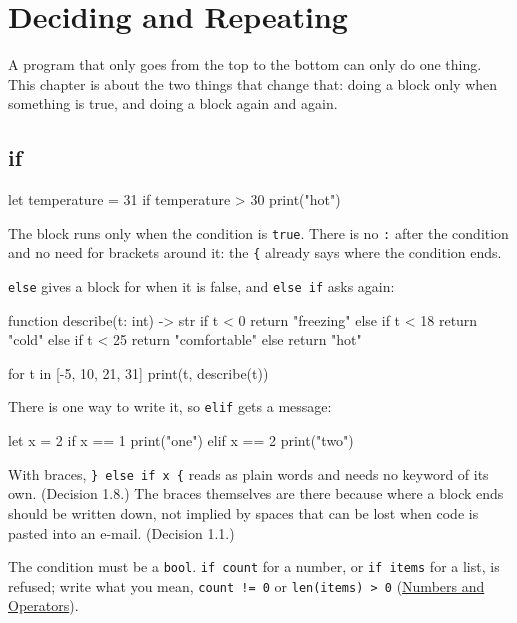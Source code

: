 \chapter{Deciding and Repeating}\label{ch-control-flow}

A program that only goes from the top to the bottom can only do one
thing. This chapter is about the two things that change that: doing a
block only when something is true, and doing a block again and again.

\section{if}

\begin{zeno}
let temperature = 31
if temperature > 30 {
    print("hot")
}
\end{zeno}

The block runs only when the condition is \verb|true|. There is no
\verb|:| after the condition and no need for brackets around it: the
\verb|{| already says where the condition ends.

\verb|else| gives a block for when it is false, and \verb|else if|
asks again:

\begin{zeno}
function describe(t: int) -> str {
    if t < 0 {
        return "freezing"
    } else if t < 18 {
        return "cold"
    } else if t < 25 {
        return "comfortable"
    } else {
        return "hot"
    }
}

for t in [-5, 10, 21, 31] {
    print(t, describe(t))
}
\end{zeno}

There is one way to write it, so \verb|elif| gets a message:

\begin{zeno}[fails=yes]
let x = 2
if x == 1 {
    print("one")
} elif x == 2 {
    print("two")
}
\end{zeno}

\begin{why}
With braces, \verb|} else if x {| reads as plain words and needs no
keyword of its own. (Decision 1.8.) The braces themselves are there
because where a block ends should be written down, not implied by
spaces that can be lost when code is pasted into an e-mail.
(Decision 1.1.)
\end{why}

The condition must be a \verb|bool|. \verb|if count| for a number, or
\verb|if items| for a list, is refused; write what you mean,
\verb|count != 0| or \verb|len(items) > 0|
(\hyperref[ch-numbers]{Numbers and Operators}).

